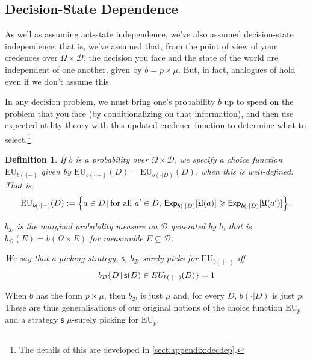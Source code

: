 \documentclass[a4paper]{article}
\newtheorem{definition}{Definition}
\newcommand\Exp{\mathsf{Exp}}
\newcommand\EU{\mathrm{EU}}
\newcommand\U{\mathfrak{U}} %
\newcommand{\D}{\mathcal{D}}
\newcommand{\Decs}{\mathcal{D}}
\renewcommand\S{\mathcal{S}}
\newcommand\s{\mathsf{s}}
\newcommand\SetDelimiter[1][]{
	\nonscript\,#1\vert \allowbreak \nonscript\,\mathopen{}}
\providecommand\given{\SetDelimiter}
\renewcommand{\geq}{\geqslant}
\newenvironment{CCM rewritten}
{\begingroup\color{blue}} %
{\endgroup}              %
\begin{document}
\subsection{Decision-State Dependence}\label{sect:decdep}

As well as assuming act-state independence, we've also assumed decision-state independence: that is, we've assumed that, from the point of view of your credences over $\Omega \times \D$, the decision you face and the state of the world are independent of one another, given by $b=p\times\mu$. But, in fact, analogues of  hold even if we don't assume this. 

In any decision problem, we must bring one's probability $b$ up to speed on the problem that you face (by conditionalizing on that information), and then use expected utility theory with this updated credence function to determine what to select.\footnote{The details of this are developed in \cref{sect:appendix:decdep}.}


\begin{definition}\label{def:cond}
	If $b$ is a probability over $\Omega\times \D$, we specify a choice function 
	$\EU_{b(\cdot|-)}$ given by $\EU_{b(\cdot|-)}(D)=\EU_{b(\cdot|D)}(D)$, when this is well-defined. That is, $$\EU_{b(\cdot|-)}(D):=\left \{a\in D\given \text{for all $a'\in D$, }\Exp_{b(\cdot|D)}[\U(a)]\geq \Exp_{b(\cdot|D)}[\U(a')]\right \}.$$%

$b_\Decs$ is the marginal probability measure on $\Decs$ generated by $b$, that is $b_\D(E)=b(\Omega\times E)$ for measurable $E\subseteq\Decs$.%

We say that %
a picking strategy, $\s$, \emph{$b_\Decs$-surely picks for $\EU_{b(\cdot|-)}$} iff \[b_\Decs\{D\given \s(D)\in EU_{b(\cdot|-)}(D)\}=1\]
\end{definition}
When $b$ has the form $p\times\mu$, then $b_\Decs$ is just $\mu$ and, for every $D$, $b(\cdot|D)$ is just $p$. These are thus generalisations of our original notions of the choice function $\EU_p$ and a strategy $\s$ $\mu$-surely picking for $\EU_p$. 
\end{document}
